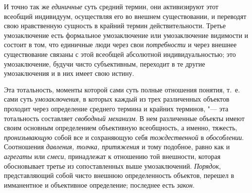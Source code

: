 {{И точно так же
{\em единичные} суть
средний термин, они активизируют этот всеобщий индивидуум, осуществляя его
во внешнем существовании, и переводят свою нравственную сущность в крайний
термин
действительности.
Третье умозаключение есть формальное умозаключение или
умозаключение видимости и состоит в том, что единичные люди через свои
{\em потребности} и через
внешнее существование связаны с этой всеобщей абсолютной индивидуальностью;
это умозаключение, будучи чисто субъективным, переходит в те другие
умозаключения и в них имеет свою
истину\label{bkm:bm52c}.

Эта тотальность, моменты которой сами суть полные отношения
понятия, т.~е. сами суть
{\em умозаключения}, в
которых каждый из трех различенных объектов проходит через определение
среднего термина и крайних терминов, "--- эта тотальность
составляет {\em свободный механизм}.
В нем различенные объекты имеют своим основным определением
объективную всеобщность, а именно, тяжесть,
{\em пронизывающую} собой
все и сохраняющую себя
{\em тождественной} в
{\em обособлении}.
Соотношения {\em давления,
толчка, притяжения} и тому подобное, равно как и
{\em агрегаты} или
{\em смеси}, принадлежат
к отношению той внешности, которая обосновывает третье из
сопоставленных выше умозаключений.
{\em Порядок},
представляющий собой чисто внешнюю определенность объектов,
перешел в имманентное и объективное определение; последнее есть
{\em закон}.

}}
